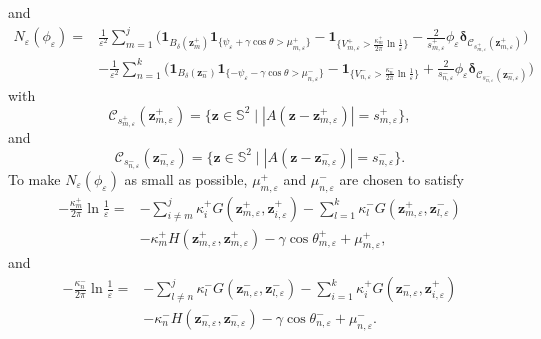 \documentclass[12pt,reqno]{amsart}
\numberwithin{equation}{section}
\theoremstyle{definition}
\theoremstyle{remark}
\begin{document}
	and
	\begin{align*}
	N_\varepsilon(\phi_\varepsilon)=&\frac{1}{\varepsilon^2}\sum\limits_{m=1}^j\bigg(\boldsymbol1_{ B_\delta(\boldsymbol z_m^+)}\boldsymbol1_{\{\psi_\varepsilon+\gamma\cos\theta>\mu_{m,\varepsilon}^+\}}-\boldsymbol1_{\{V_{m,\varepsilon}^+>\frac{\kappa_m^+}{2\pi}\ln\frac{1}{\varepsilon}\}}-\frac{2}{s_{m,\varepsilon}^+}\phi_\varepsilon\boldsymbol\delta_{\mathcal C_{s_{m,\varepsilon}^+}(\boldsymbol z_{m,\varepsilon}^+)}\bigg)\\
	&-\frac{1}{\varepsilon^2}\sum\limits_{n=1}^k\bigg(\boldsymbol1_{B_\delta(\boldsymbol z_n^-)}\boldsymbol1_{\{-\psi_\varepsilon-\gamma\cos\theta>\mu_{n,\varepsilon}^-\}}-\boldsymbol1_{\{V_{n,\varepsilon}^->\frac{\kappa_n^-}{2\pi}\ln\frac{1}{\varepsilon}\}}+\frac{2}{s_{n,\varepsilon}^-}\phi_\varepsilon\boldsymbol\delta_{\mathcal C_{s_{n,\varepsilon}^-}(\boldsymbol z_{n,\varepsilon}^-)}\bigg)
	\end{align*}
	with 
	$$\mathcal C_{s_{m,\varepsilon}^+}(\boldsymbol z_{m,\varepsilon}^+)=\{\boldsymbol z\in \mathbb S^2\mid |A(\boldsymbol z-\boldsymbol z^+_{m,\varepsilon})|= s_{m,\varepsilon}^+\},$$
	and
	$$\mathcal C_{s_{n,\varepsilon}^-}(\boldsymbol z_{n,\varepsilon}^-)=\{\boldsymbol z\in \mathbb S^2\mid |A(\boldsymbol z-\boldsymbol z^-_{n,\varepsilon})|= s_{n,\varepsilon}^-\}.$$ 
	To make $N_\varepsilon(\phi_\varepsilon)$ as small as possible, $\mu_{m,\varepsilon}^+$ and $\mu_{n,\varepsilon}^-$ are chosen to satisfy
	\begin{align*}
		-\frac{\kappa_m^+}{2\pi}\ln\frac{1}{\varepsilon}=&-\sum\limits_{i\neq m}^j\kappa_i^+G(\boldsymbol z_{m,\varepsilon}^+,\boldsymbol z_{i,\varepsilon}^+)-\sum\limits_{l=1}^k\kappa_l^-G(\boldsymbol z_{m,\varepsilon}^+,\boldsymbol z_{l,\varepsilon}^-)\\
		&-\kappa_m^+ H(\boldsymbol z_{m,\varepsilon}^+,\boldsymbol z_{m,\varepsilon}^+)-\gamma\cos\theta_{m,\varepsilon}^++\mu_{m,\varepsilon}^+,
	\end{align*}
	and
	\begin{align*}
		-\frac{\kappa_n^-}{2\pi}\ln\frac{1}{\varepsilon}=&-\sum\limits_{l\neq n}^j\kappa_l^-G(\boldsymbol z_{n,\varepsilon}^-,\boldsymbol z_{l,\varepsilon}^-)-\sum\limits_{i=1}^k\kappa_i^+G(\boldsymbol z_{n,\varepsilon}^-,\boldsymbol z_{i,\varepsilon}^+)\\
		&- \kappa_n^-H(\boldsymbol z_{n,\varepsilon}^-,\boldsymbol z_{n,\varepsilon}^-)-\gamma\cos\theta_{n,\varepsilon}^-+\mu_{n,\varepsilon}^-.
	\end{align*}
	
\end{document}

